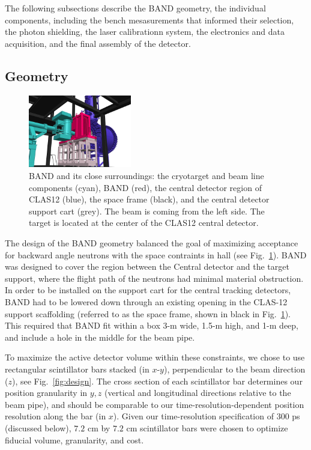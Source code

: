 \documentclass[3p,twocolumn]{elsarticle}
\begin{document}
The following subsections describe the BAND geometry, the individual components,
including the bench mesasurements that informed their selection, the photon
shielding, the laser calibrationn system, the electronics and data acquisition, 
and the final assembly of the detector.

\subsection{Geometry}
\begin{figure}[tb]
	\centering
		\includegraphics[width=0.40\textwidth]{FULL_CONTEXT_STUDIE_3.jpg}
		\vspace{0.5cm}
	    \caption{BAND and its close surroundings: the
                  cryotarget and beam line components (cyan),  BAND
                  (red), the central detector region of CLAS12
                  (blue), the space frame (black), and the central detector support cart (grey). The beam is coming from the left side. The
                  target is located at the center of the CLAS12 central detector.}
		\label{fig:bandtarget}
		
\end{figure}

The design of the BAND geometry balanced the goal of maximizing acceptance for backward angle neutrons
with the space contraints in hall (see Fig.~\ref{fig:bandtarget}). BAND was designed to cover the region
between the Central detector and the target support, where the flight path of the neutrons had minimal
material obstruction. In order to be installed on the support cart for the central tracking detectors, BAND
had to be lowered down through an existing opening in the CLAS-12 support scaffolding (referred to as the space
frame, shown in black in Fig.~\ref{fig:bandtarget}). This required that BAND fit within a box 3-\si{\meter} wide, 1.5-\si{\meter} high, and 1-\si{\meter} deep, and include a hole in the middle for the beam pipe. 


To maximize the active detector volume within these constraints, we
chose to use rectangular scintillator bars stacked (in $x$-$y$), perpendicular to
the beam direction ($z$), see Fig.~\ref{fig:design}.  The cross
section of each scintillator bar determines our position granularity
in $y,z$ (vertical and longitudinal directions relative to the beam
pipe), and should be comparable to our time-resolution-dependent position
resolution along the bar (in $x$). Given our time-resolution specification of
$300$ \si{\pico\second} (discussed below), $7.2$
\si{\centi\meter} by $7.2$ \si{\centi\meter} scintillator bars were
chosen to optimize fiducial volume, granularity, and cost.
\end{document}
